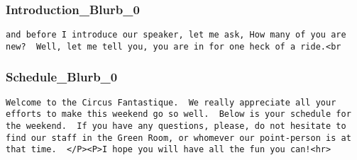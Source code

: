 \documentclass[captions=tablesignature]{scrartcl}
\begin{document}
\subsubsection{Introduction\_Blurb\_0}
\label{sec-3-7-2}
\begin{verbatim}
and before I introduce our speaker, let me ask, How many of you are
new?  Well, let me tell you, you are in for one heck of a ride.<br
\end{verbatim}

\subsubsection{Schedule\_Blurb\_0}
\label{sec-3-7-3}
\begin{verbatim}
Welcome to the Circus Fantastique.  We really appreciate all your
efforts to make this weekend go so well.  Below is your schedule for
the weekend.  If you have any questions, please, do not hesitate to
find our staff in the Green Room, or whomever our point-person is at
that time.  </P><P>I hope you will have all the fun you can!<hr>
\end{verbatim}
\end{document}
